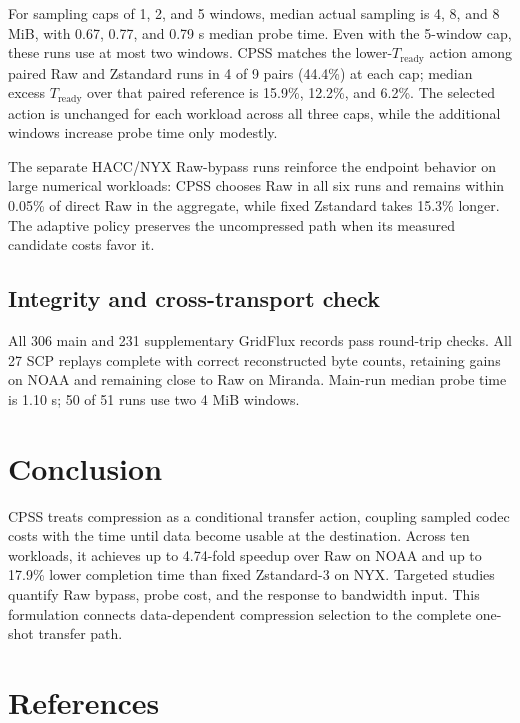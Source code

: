 \documentclass[smallabstract,smallcaptions]{dccpaper}
\renewcommand{\Section}[1]{\vspace*{-0.05in}\section{#1}\vspace{0.025in}}
\renewcommand{\SubSection}[1]{\vspace*{-0.125in}\subsection{#1}}
\begin{document}
For sampling caps of 1, 2, and 5 windows, median actual sampling is 4, 8, and 8 MiB, with 0.67, 0.77, and 0.79 s median probe time. Even with the 5-window cap, these runs use at most two windows. CPSS matches the lower-$T_{\mathrm{ready}}$ action among paired Raw and Zstandard runs in 4 of 9 pairs (44.4\%) at each cap; median excess $T_{\mathrm{ready}}$ over that paired reference is 15.9\%, 12.2\%, and 6.2\%. The selected action is unchanged for each workload across all three caps, while the additional windows increase probe time only modestly.

The separate HACC/NYX Raw-bypass runs reinforce the endpoint behavior on large numerical workloads: CPSS chooses Raw in all six runs and remains within 0.05\% of direct Raw in the aggregate, while fixed Zstandard takes 15.3\% longer. The adaptive policy preserves the uncompressed path when its measured candidate costs favor it.

\SubSection{Integrity and cross-transport check}
All 306 main and 231 supplementary GridFlux records pass round-trip checks. All 27 SCP replays complete with correct reconstructed byte counts, retaining gains on NOAA and remaining close to Raw on Miranda. Main-run median probe time is 1.10 s; 50 of 51 runs use two 4 MiB windows.

\FloatBarrier
\Section{Conclusion}

CPSS treats compression as a conditional transfer action, coupling sampled codec costs with the time until data become usable at the destination. Across ten workloads, it achieves up to 4.74-fold speedup over Raw on NOAA and up to 17.9\% lower completion time than fixed Zstandard-3 on NYX. Targeted studies quantify Raw bypass, probe cost, and the response to bandwidth input. This formulation connects data-dependent compression selection to the complete one-shot transfer path.

\FloatBarrier
\section*{References}


\end{document}
